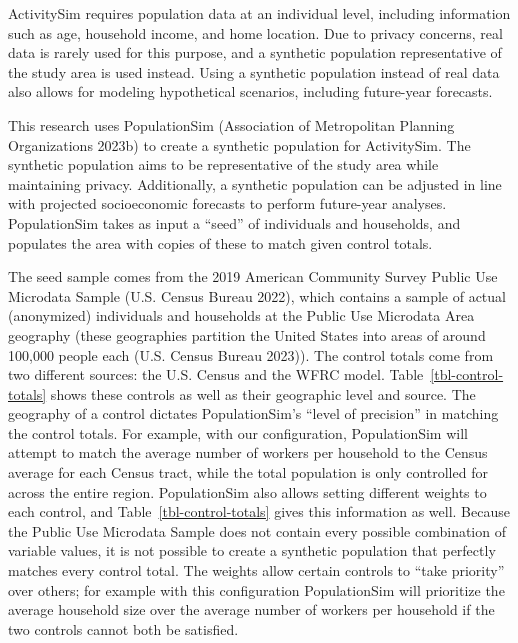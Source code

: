 \documentclass[fancy, oneside, mastersfancy, ms]{byuthesis}
\begin{document}
ActivitySim requires population data at an individual level, including
information such as age, household income, and home location. Due to
privacy concerns, real data is rarely used for this purpose, and a
synthetic population representative of the study area is used instead.
Using a synthetic population instead of real data also allows for
modeling hypothetical scenarios, including future-year forecasts.

This research uses PopulationSim (Association of Metropolitan Planning
Organizations 2023b) to create a synthetic population for ActivitySim.
The synthetic population aims to be representative of the study area
while maintaining privacy. Additionally, a synthetic population can be
adjusted in line with projected socioeconomic forecasts to perform
future-year analyses. PopulationSim takes as input a ``seed'' of
individuals and households, and populates the area with copies of these
to match given control totals.

The seed sample comes from the 2019 American Community Survey Public Use
Microdata Sample (U.S. Census Bureau 2022), which contains a sample of
actual (anonymized) individuals and households at the Public Use
Microdata Area geography (these geographies partition the United States
into areas of around 100,000 people each (U.S. Census Bureau 2023)). The
control totals come from two different sources: the U.S. Census and the
WFRC model. Table~\ref{tbl-control-totals} shows these controls as well
as their geographic level and source. The geography of a control
dictates PopulationSim's ``level of precision'' in matching the control
totals. For example, with our configuration, PopulationSim will attempt
to match the average number of workers per household to the Census
average for each Census tract, while the total population is only
controlled for across the entire region. PopulationSim also allows
setting different weights to each control, and
Table~\ref{tbl-control-totals} gives this information as well. Because
the Public Use Microdata Sample does not contain every possible
combination of variable values, it is not possible to create a synthetic
population that perfectly matches every control total. The weights allow
certain controls to ``take priority'' over others; for example with this
configuration PopulationSim will prioritize the average household size
over the average number of workers per household if the two controls
cannot both be satisfied.
\end{document}
